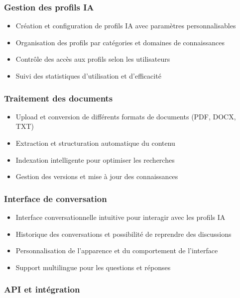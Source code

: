 \subsubsection{Gestion des profils IA}

\begin{itemize}
  \item Création et configuration de profils IA avec paramètres personnalisables
  \item Organisation des profils par catégories et domaines de connaissances
  \item Contrôle des accès aux profils selon les utilisateurs
  \item Suivi des statistiques d'utilisation et d'efficacité
\end{itemize}

\subsubsection{Traitement des documents}

\begin{itemize}
  \item Upload et conversion de différents formats de documents (PDF, DOCX, TXT)
  \item Extraction et structuration automatique du contenu
  \item Indexation intelligente pour optimiser les recherches
  \item Gestion des versions et mise à jour des connaissances
\end{itemize}

\subsubsection{Interface de conversation}

\begin{itemize}
  \item Interface conversationnelle intuitive pour interagir avec les profils IA
  \item Historique des conversations et possibilité de reprendre des discussions
  \item Personnalisation de l'apparence et du comportement de l'interface
  \item Support multilingue pour les questions et réponses
\end{itemize}

\subsubsection{API et intégration}

